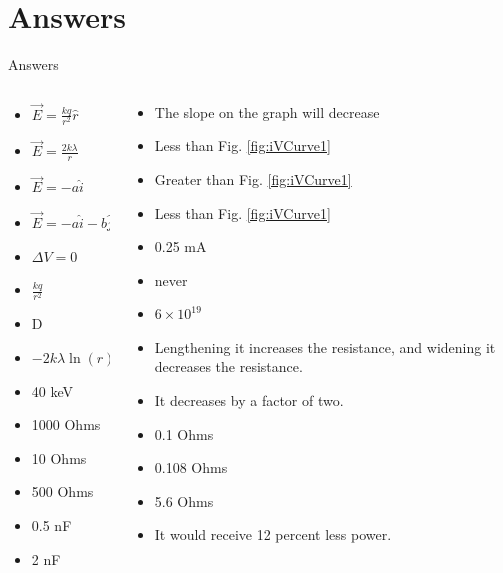 \documentclass{beamer}
\begin{document}
\section{Answers}

\begin{frame}{Answers}
\tiny
\begin{columns}[T]
\begin{column}{0.5\textwidth}
\begin{itemize}
\item $\vec{E} = \frac{kq}{r^2}\hat{r}$
\item $\vec{E} = \frac{2k\lambda}{r}$
\item $\vec{E} = -a\hat{i}$
\item $\vec{E} = -a\hat{i}-b\hat{j}$
\item $\Delta V = 0$
\item $\frac{kq}{r^2}$
\item D
\item $-2k\lambda\ln(r) + V_0$
\item 40 keV
\item 1000 Ohms
\item 10 Ohms
\item 500 Ohms
\item 0.5 nF
\item 2 nF
\end{itemize}
\end{column}
\begin{column}{0.5\textwidth}
\begin{itemize}
\item The slope on the graph will decrease
\item Less than Fig. \ref{fig:iVCurve1}
\item Greater than Fig. \ref{fig:iVCurve1}
\item Less than Fig. \ref{fig:iVCurve1}
\item 0.25 mA
\item never
\item $6 \times 10^{19}$
\item Lengthening it increases the resistance, and widening it decreases the resistance.
\item It decreases by a factor of two.
\item 0.1 Ohms
\item 0.108 Ohms
\item 5.6 Ohms
\item It would receive 12 percent less power.
\end{itemize}
\end{column}
\end{columns}
\end{frame}
\end{document}

